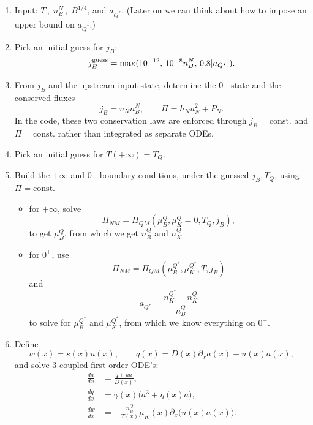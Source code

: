 \documentclass[11pt]{article}
\begin{document}
\begin{enumerate}
\item Input: $T\,,\; n_B^N\,,\; B^{1/4}$, and $a_{Q^\ast}$. (Later on we can think about how to impose an upper bound on $a_{Q^\ast}$.)
\item Pick an initial guess for $j_B$:
\begin{equation}
j_B^{\rm guess}
=
\max(10^{-12},\,10^{-8}n_B^N,\,0.8 |a_{Q^\star}|).
\end{equation}
\item From $j_B$ and the upstream input state, determine the $0^-$ state and the conserved fluxes
\begin{equation}
j_B = u_N n_B^N,\qquad \Pi = h_N u_N^2 + P_N.
\end{equation}
In the code, these two conservation laws are enforced through $j_B=\mathrm{const.}$ and $\Pi=\mathrm{const.}$ rather than integrated as separate ODEs.
\item Pick an initial guess for $T(+\infty) = T_Q$.
\item Build the $+\infty$ and $0^+$ boundary conditions, under the guessed $j_B, T_Q$, using $\Pi = \mathrm{const.}$
\begin{itemize}
\item for $+\infty$, solve
\begin{equation}
\Pi_{NM} = \Pi_{QM}(\mu_B^Q, \mu_K^Q=0, T_Q, j_B),
\end{equation}
to get $\mu_B^Q$, from which we get $n_B^Q$ and $n_K^Q$
\item for $0^+$, use
\begin{equation}
\Pi_{NM} = \Pi_{QM}(\mu_B^{Q^\ast}, \mu_K^{Q^\ast}, T, j_B)
\end{equation}
and
\begin{equation}
a_{Q^\ast} = \frac{n_K^{Q^\ast} - n_K^Q}{n_B^Q}
\end{equation}
to solve for $\mu_B^{Q^\ast}$ and $\mu_K^{Q^\ast}$, from which we know everything on $0^+$.
\end{itemize}
\item Define
\begin{equation}
w(x) = s(x)u(x),\qquad q(x)=D(x)\partial_x a(x)-u(x)a(x),
\end{equation}
and solve 3 coupled first-order ODE's:
\begin{align}
\frac{da}{dx} &= \frac{q+u a}{D(x)},\\
\frac{dq}{dx} &= \gamma(x)\bigl(a^3+\eta(x)a\bigr),\\
\frac{dw}{dx} &= -\frac{n_B^Q}{T(x)}\mu_K(x)\partial_x\Big(u(x) a(x)\Big).

\end{align}
\end{enumerate}
\end{document}
